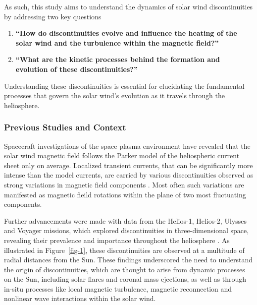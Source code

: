 \documentclass[
  letterpaper,
  DIV=11,
  numbers=noendperiod]{scrartcl}
\begin{document}
As such, this study aims to understand the dynamics of solar wind discontinuities by addressing two key questions

\begin{enumerate}
\def\labelenumi{\arabic{enumi}.}
\item
  \textbf{``How do discontinuities evolve and influence the heating of the solar wind and the turbulence within the magnetic field?''}
\item
  \textbf{``What are the kinetic processes behind the formation and evolution of these discontinuities?''}
\end{enumerate}

Understanding these discontinuities is essential for elucidating the fundamental processes that govern the solar wind's evolution as it travels through the heliosphere.

\subsubsection{Previous Studies and Context}\label{previous-studies-and-context}

Spacecraft investigations of the space plasma environment have revealed that the solar wind magnetic field follows the Parker model of the heliospheric current sheet only on average. Localized transient currents, that can be significantly more intense than the model currents, are carried by various discontinuities observed as strong variations in magnetic field components \citep{colburnDiscontinuitiesSolarWind1966, burlagaMicroscaleStructuresInterplanetary1968, turnerOrientationsRotationalTangential1971}. Most often such variations are manifested as magnetic fieild rotations within the plane of two most fluctuating components.

Further advancements were made with data from the Helios-1, Helios-2, Ulysses and Voyager missions, which explored discontinuities in three-dimensional space, revealing their prevalence and importance throughout the heliosphere \citep{marianiStatisticalStudyMagnetohydrodynamic1983, tsurutaniNonlinearElectromagneticWaves1997}. As illustrated in Figure~\ref{fig-1}, these discontinuities are observed at a multitude of radial distances from the Sun. These findings underscored the need to understand the origin of discontinuities, which are thought to arise from dynamic processes on the Sun, including solar flares and coronal mass ejections, as well as through in-situ processes like local magnetic turbulence, magnetic reconnection and nonlinear wave interactions within the solar wind.
\end{document}
